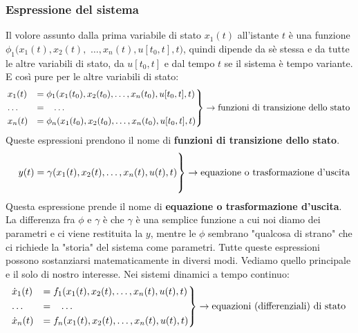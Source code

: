 \subsubsection{Espressione del sistema}
Il volore assunto dalla prima variabile di stato $x_1(t)$ all'istante $t$ è una funzione $\phi_1(x_1(t),x_2(t),$ $\dots, x_n(t), u[t_0,t], t)$, quindi dipende da sè stessa e da tutte le altre variabili di stato, da  $u[t_0,t]$ e dal tempo $t$ se il sistema è tempo variante. E così pure per le altre variabili di stato:
\[
    \begin{rcases}
        x_1(t) &= \phi_1(x_1(t_0),x_2(t_0), \dots, x_n(t_0), u[t_0,t], t)\\
        \dots \;\;\;&= \;\;\;\dots\\
        x_n(t) &= \phi_n(x_1(t_0),x_2(t_0), \dots, x_n(t_0), u[t_0,t], t)
    \end{rcases} \rightarrow \text{funzioni di transizione dello stato}\;
\]
Queste espressioni prendono il nome di \textbf{funzioni di transizione dello stato}.
\[
    \begin{rcases}
        \\
        \;\;\;\; y(t) = \gamma(x_1(t),x_2(t), \dots, x_n(t), u(t), t)\\
        \\
    \end{rcases} \rightarrow \text{equazione o trasformazione d'uscita}\;
\]
Questa espressione prende il nome di \textbf{equazione o trasformazione d'uscita}.\newline
\newline
La differenza fra $\phi$ e $\gamma$ è che $\gamma$ è una semplice funzione a cui noi diamo dei parametri e ci viene restituita la $y$, mentre le $\phi$ sembrano "qualcosa di strano" che ci richiede la "storia" del sistema come parametri.\newline
\newline
Tutte queste espressioni possono sostanziarsi matematicamente in diversi modi. Vediamo quello principale e il solo di nostro interesse.\newline
\newline
Nei sistemi dinamici a tempo continuo:
\[
    \begin{rcases}
        \dot{x}_1(t) &= f_1(x_1(t),x_2(t), \dots, x_n(t), u(t), t)\\
        \dots \;\;\;&= \;\;\;\dots\\
        \dot{x}_n(t) &= f_n(x_1(t),x_2(t), \dots, x_n(t), u(t), t)
    \end{rcases} \rightarrow \text{equazioni (differenziali) di stato}\;
\]
